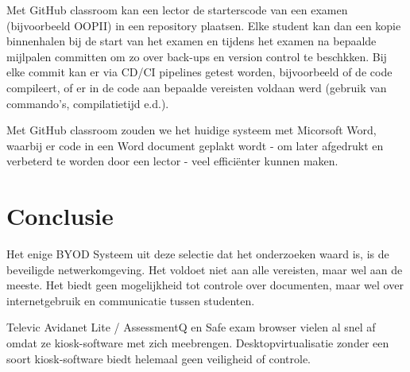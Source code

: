 Met GitHub classroom kan een lector de starterscode van een examen (bijvoorbeeld OOPII) in een repository plaatsen. Elke student kan dan een kopie binnenhalen bij de start van het examen en tijdens het examen na bepaalde mijlpalen committen om zo over back-ups en version control te beschkken. Bij elke commit kan er via CD/CI pipelines getest worden, bijvoorbeeld of de code compileert, of er in de code aan bepaalde vereisten voldaan werd (gebruik van commando's, compilatietijd e.d.). 

Met GitHub classroom zouden we het huidige systeem met Micorsoft Word, waarbij er code in een Word document geplakt wordt - om later afgedrukt en verbeterd te worden door een lector \autocite{Roobrouck2019} - veel effici\"{e}nter kunnen maken.  
\newpage 

\section{Conclusie}

Het enige BYOD Systeem uit deze selectie dat het onderzoeken waard is, is de beveiligde netwerkomgeving. Het voldoet niet aan alle vereisten, maar wel aan de meeste. Het biedt geen mogelijkheid tot controle over documenten, maar wel over internetgebruik en communicatie tussen studenten.

 Televic Avidanet Lite / AssessmentQ en Safe exam browser vielen al snel af omdat ze kiosk-software met zich meebrengen. Desktopvirtualisatie zonder een soort kiosk-software biedt helemaal geen veiligheid of controle. 


